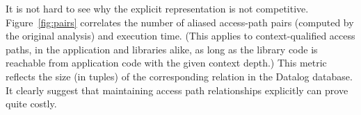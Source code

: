 


It is not hard to see why the explicit representation is not
competitive.  Figure~\ref{fig:pairs} correlates the number of aliased
access-path pairs (computed by the original analysis) and execution
time.  (This applies to context-qualified access paths, in the
application and libraries alike, as long as the library code is
reachable from application code with the given context depth.) This
metric reflects the size (in tuples) of the corresponding relation in
the Datalog database. It clearly suggest that maintaining access path
relationships explicitly can prove quite costly.

